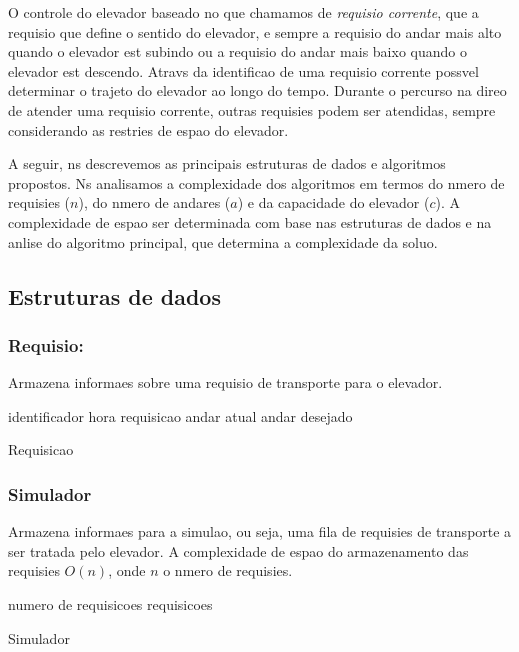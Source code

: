 \documentclass[12pt]{article}
\begin{document}
O controle do elevador  baseado no que chamamos de \textit{requisio corrente}, que  a requisio que define o sentido do elevador, e  sempre a requisio do andar mais alto quando o elevador est subindo ou a requisio do andar mais baixo quando o elevador est descendo. Atravs da identificao de uma requisio corrente  possvel determinar o trajeto do elevador ao longo do tempo. Durante o percurso na direo de atender uma requisio corrente, outras requisies podem ser atendidas, sempre considerando as restries de espao do elevador.

A seguir, ns descrevemos as principais estruturas de dados e algoritmos propostos. Ns analisamos a complexidade dos algoritmos em termos do nmero de requisies ($n$), do nmero de andares ($a$) e da capacidade do elevador ($c$). A complexidade de espao ser determinada com base nas estruturas de dados e na anlise do algoritmo principal, que determina a complexidade da soluo.

\subsection{Estruturas de dados}

\subsubsection{Requisio:}

Armazena informaes sobre uma requisio de transporte para o elevador.
\begin{algorithm}[h!]
\begin{footnotesize}

	identificador\;
	hora requisicao\;
	andar atual\;
	andar desejado\;

\caption{Requisicao}%
\end{footnotesize}
\end{algorithm}

\subsubsection{Simulador}

Armazena informaes para a simulao, ou seja, uma fila de requisies de transporte a ser tratada pelo elevador. A complexidade de espao do armazenamento das requisies  $O(n)$, onde $n$  o nmero de requisies.
\begin{algorithm}[h!]
\begin{footnotesize}
	numero de requisicoes\;
	requisicoes\;

\caption{Simulador}%
\end{footnotesize}
\end{algorithm}
\end{document}
